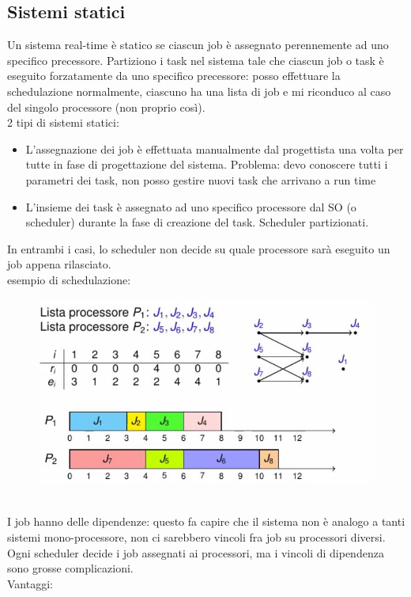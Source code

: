 \documentclass[12pt, oneside]{extbook}
\begin{document}
\subsection{Sistemi statici}
Un sistema real-time è statico se ciascun job è assegnato perennemente ad uno specifico precessore. Partiziono i task nel sistema tale che ciascun job o task è eseguito forzatamente da uno specifico precessore: posso effettuare la schedulazione normalmente, ciascuno ha una lista di job e mi riconduco al caso del singolo processore (non proprio così).\\ 2 tipi di sistemi statici:
\begin{itemize}
\item L'assegnazione dei job è effettuata manualmente dal progettista una volta per tutte in fase di progettazione del sistema. Problema: devo conoscere tutti i parametri dei task, non posso gestire nuovi task che arrivano a run time
\item L'insieme dei task è assegnato ad uno specifico processore dal SO (o scheduler) durante la fase di creazione del task. Scheduler partizionati.
\end{itemize}
In entrambi i casi, lo scheduler non decide su quale processore sarà eseguito un job appena rilasciato.\\ esempio di schedulazione:\\
\begin{figure}[!h]
\centering
\includegraphics[scale=0.4]{immagini/image-035.jpg}
\end{figure}
\\I job hanno delle dipendenze: questo fa capire che il sistema non è analogo a tanti sistemi mono-processore, non ci sarebbero vincoli fra job su processori diversi. Ogni scheduler decide i job assegnati ai processori, ma i vincoli di dipendenza sono grosse complicazioni.\\ Vantaggi:
\end{document}
